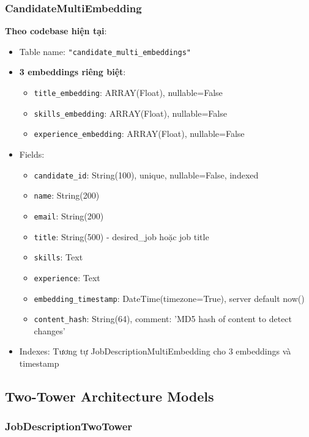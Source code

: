 \subsubsection{CandidateMultiEmbedding}

\textbf{Theo codebase hiện tại}:
\begin{itemize}
    \item Table name: \texttt{"candidate\_multi\_embeddings"}
    \item \textbf{3 embeddings riêng biệt}:
    \begin{itemize}
        \item \texttt{title\_embedding}: ARRAY(Float), nullable=False
        \item \texttt{skills\_embedding}: ARRAY(Float), nullable=False
        \item \texttt{experience\_embedding}: ARRAY(Float), nullable=False
    \end{itemize}
    \item Fields:
    \begin{itemize}
        \item \texttt{candidate\_id}: String(100), unique, nullable=False, indexed
        \item \texttt{name}: String(200)
        \item \texttt{email}: String(200)
        \item \texttt{title}: String(500) - desired\_job hoặc job title
        \item \texttt{skills}: Text
        \item \texttt{experience}: Text
        \item \texttt{embedding\_timestamp}: DateTime(timezone=True), server default now()
        \item \texttt{content\_hash}: String(64), comment: 'MD5 hash of content to detect changes'
    \end{itemize}
    \item Indexes: Tương tự JobDescriptionMultiEmbedding cho 3 embeddings và timestamp
\end{itemize}

\subsection{Two-Tower Architecture Models}

\subsubsection{JobDescriptionTwoTower}

